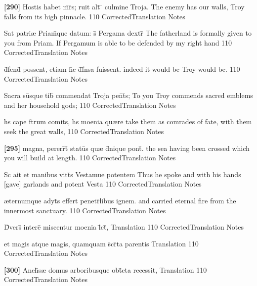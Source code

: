 \latline
  {\textbf{[290]} Hostis habet m\={}r\={}s; ruit alt\={} \={} culmine Troja.}
  { The enemy has our walls, Troy falls from its high pinnacle. }
  {110}
  { CorrectedTranslation }
  { Notes }


\latline
  {Sat patri{\ae} Priam\={}que datum: s\={\macron {\i}} Pergama dextr\={}}
  { The fatherland is formally given to you from Priam.  If Pergamum is able to be defended by my right hand }
  {110}
  { CorrectedTranslation }
  { Notes }


\latline
  {d\={}fend\={\macron {\i}} possent, etiam h\={}c d\={}f\={}nsa fuissent.}
  { indeed it would be Troy would be. }
  {110}
  { CorrectedTranslation }
  { Notes }


\latline
  {Sacra su\={}sque tib\={\macron {\i}} commendat Troja pen\={}t\={\macron {\i}}s;}
  { To you Troy commends sacred emblems and her household gods; }
  {110}
  { CorrectedTranslation }
  { Notes }


\latline
  {h\={}s cape f\={}t\={}rum comit\={}s, h\={\macron {\i}}s moenia qu{\ae}re }
  { take them as comrades of fate, with them seek the great walls, }
  {110}
  { CorrectedTranslation }
  { Notes }


\latline
  {\textbf{[295]} magna, pererr\={}t\={} statu\={}s qu{\ae} d\={}nique pont\={}.}
  { the sea having been crossed which you will build at length. }
  {110}
  { CorrectedTranslation }
  { Notes }


\latline
  {S\={\macron {\i}}c ait et manibus vitt\={}s Vestamue potentem}
  { Thus he spoke and with his hands [gave] garlands and potent Vesta }
  {110}
  { CorrectedTranslation }
  { Notes }


\latline
  {{\ae}ternumque adyt\={\macron {\i}}s effert penetr\={}libus ignem.}
  { and carried eternal fire from the innermost sanctuary. }
  {110}
  { CorrectedTranslation }
  { Notes }


\latline
  {D\={\macron {\i}}vers\={} intere\={} miscentur moenia l\={}ct\={},}
  { Translation }
  {110}
  { CorrectedTranslation }
  { Notes }


\latline
  {et magis atque magis, quamquam s\={}cr\={}ta parentis}
  { Translation }
  {110}
  { CorrectedTranslation }
  { Notes }


\latline
  {\textbf{[300]} Anch\={\macron {\i}}s{\ae} domus arboribusque obt\={}cta recessit,}
  { Translation }
  {110}
  { CorrectedTranslation }
  { Notes }


